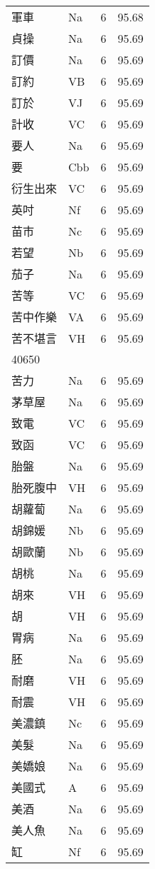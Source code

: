 \documentclass[twocolumn]{book}
\begin{document}
\begin{supertabular}{llrr}
軍車 & Na & 6 &  95.68\\
貞操 & Na & 6 &  95.69\\
訂價 & Na & 6 &  95.69\\
訂約 & VB & 6 &  95.69\\
訂於 & VJ & 6 &  95.69\\
計收 & VC & 6 &  95.69\\
要人 & Na & 6 &  95.69\\
要 & Cbb & 6 &  95.69\\
衍生出來 & VC & 6 &  95.69\\
英吋 & Nf & 6 &  95.69\\
苗市 & Nc & 6 &  95.69\\
若望 & Nb & 6 &  95.69\\
茄子 & Na & 6 &  95.69\\
苦等 & VC & 6 &  95.69\\
苦中作樂 & VA & 6 &  95.69\\
苦不堪言 & VH & 6 &  95.69\\
40650\\
苦力 & Na & 6 &  95.69\\
茅草屋 & Na & 6 &  95.69\\
致電 & VC & 6 &  95.69\\
致函 & VC & 6 &  95.69\\
胎盤 & Na & 6 &  95.69\\
胎死腹中 & VH & 6 &  95.69\\
胡蘿蔔 & Na & 6 &  95.69\\
胡錦媛 & Nb & 6 &  95.69\\
胡歐蘭 & Nb & 6 &  95.69\\
胡桃 & Na & 6 &  95.69\\
胡來 & VH & 6 &  95.69\\
胡 & VH & 6 &  95.69\\
胃病 & Na & 6 &  95.69\\
胚 & Na & 6 &  95.69\\
耐磨 & VH & 6 &  95.69\\
耐震 & VH & 6 &  95.69\\
美濃鎮 & Nc & 6 &  95.69\\
美髮 & Na & 6 &  95.69\\
美嬌娘 & Na & 6 &  95.69\\
美國式 & A & 6 &  95.69\\
美酒 & Na & 6 &  95.69\\
美人魚 & Na & 6 &  95.69\\
缸 & Nf & 6 &  95.69\\

\end{supertabular}
\end{document}

